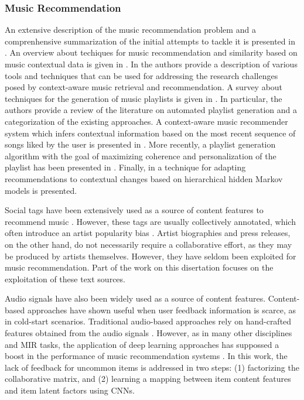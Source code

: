 \subsubsection{Music Recommendation}
\label{sec:SOA:mir:recommendation:music}

An extensive description of the music recommendation problem and a comprenhensive summarization of the initial attempts to tackle it is presented in \citep{Celma2010}. An overview about techiques for music recommendation and similarity based on music contextual data is given in \citep{Knees2013}. 
In \citep{KaminskasR12} the authors provide a description of various tools and techniques that can be used for addressing the research
challenges posed by context-aware music retrieval and recommendation. 
A survey about techniques for the generation of music playlists is given in \citep{Bonnin2014}. In particular, the authors provide a review of the literature on automated playlist generation and a categorization of the existing approaches. 
A context-aware music recommender system which infers contextual information based on the most recent sequence of songs liked by the user is presented in \citep{HaririMB12}.
More recently, a playlist generation algorithm with the goal of maximizing coherence and personalization of the playlist has been presented in \citep{Jannach2015}. Finally, in \citep{AghdamHMB15} a technique for adapting recommendations to contextual changes based on hierarchical hidden Markov models is presented.

Social tags have been extensively used as a source of content features to recommend music \citep{Knees2013}. However, these tags are usually collectively annotated, which often introduce an artist popularity bias \citep{Turnbull2008}.
Artist biographies and press releases, on the other hand, do not necessarily require a collaborative effort, as they may be produced by artists themselves. 
However, they have seldom been exploited for music recommendation.
Part of the work on this disertation focuses on the exploitation of these text sources.

Audio signals have also been widely used as a source of content features. Content-based approaches have shown useful when user feedback information is scarce, as in cold-start scenarios. Traditional audio-based approaches rely on hand-crafted features obtained from the audio signals \citep{Bogdanov2013}. However, as in many other disciplines and MIR tasks, the application of deep learning approaches has suppossed a boost in the performance of music recommendation systems \citep{Oord2013}. In this work, the lack of feedback for uncommon items is addressed in two steps: (1) factorizing the collaborative matrix, and (2) learning a mapping between item content features and item latent factors using CNNs.

